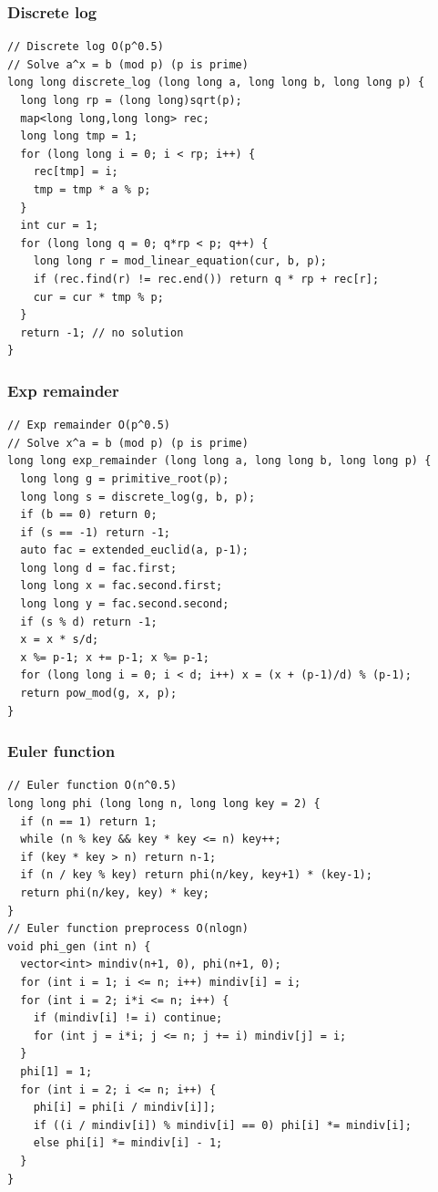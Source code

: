 \documentclass[10pt,letterpaper,landscape]{article}
\begin{document}
\begin{multicols}{2}
\subsubsection{Discrete log}
\begin{lstlisting}
// Discrete log O(p^0.5)
// Solve a^x = b (mod p) (p is prime)
long long discrete_log (long long a, long long b, long long p) {
  long long rp = (long long)sqrt(p);
  map<long long,long long> rec;
  long long tmp = 1;
  for (long long i = 0; i < rp; i++) {
    rec[tmp] = i;
    tmp = tmp * a % p;
  }
  int cur = 1;
  for (long long q = 0; q*rp < p; q++) {
    long long r = mod_linear_equation(cur, b, p);
    if (rec.find(r) != rec.end()) return q * rp + rec[r];
    cur = cur * tmp % p;
  }
  return -1; // no solution
}
\end{lstlisting}
\subsubsection{Exp remainder}
\begin{lstlisting}
// Exp remainder O(p^0.5)
// Solve x^a = b (mod p) (p is prime)
long long exp_remainder (long long a, long long b, long long p) {
  long long g = primitive_root(p);
  long long s = discrete_log(g, b, p);
  if (b == 0) return 0;
  if (s == -1) return -1;
  auto fac = extended_euclid(a, p-1);
  long long d = fac.first;
  long long x = fac.second.first;
  long long y = fac.second.second;
  if (s % d) return -1;
  x = x * s/d;
  x %= p-1; x += p-1; x %= p-1;
  for (long long i = 0; i < d; i++) x = (x + (p-1)/d) % (p-1);
  return pow_mod(g, x, p);
}
\end{lstlisting}
\subsubsection{Euler function}
\begin{lstlisting}
// Euler function O(n^0.5)
long long phi (long long n, long long key = 2) {
  if (n == 1) return 1;
  while (n % key && key * key <= n) key++;
  if (key * key > n) return n-1;
  if (n / key % key) return phi(n/key, key+1) * (key-1);
  return phi(n/key, key) * key;
}
// Euler function preprocess O(nlogn)
void phi_gen (int n) {
  vector<int> mindiv(n+1, 0), phi(n+1, 0);
  for (int i = 1; i <= n; i++) mindiv[i] = i;
  for (int i = 2; i*i <= n; i++) {
    if (mindiv[i] != i) continue;
    for (int j = i*i; j <= n; j += i) mindiv[j] = i;
  }
  phi[1] = 1;
  for (int i = 2; i <= n; i++) {
    phi[i] = phi[i / mindiv[i]];
    if ((i / mindiv[i]) % mindiv[i] == 0) phi[i] *= mindiv[i];
    else phi[i] *= mindiv[i] - 1;
  }
}
\end{lstlisting}

\end{multicols}
\end{document}
